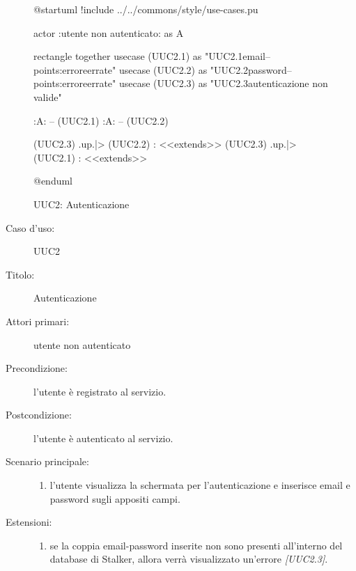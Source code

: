 \documentclass[../../../analisi-dei-requisiti.tex]{subfiles}
\begin{document}
\begin{figure}[h!]
  \centering
  \begin{plantuml}
  @startuml
  !include ../../commons/style/use-cases.pu

  actor :utente non autenticato: as A

  rectangle {
    together {
      usecase (UUC2.1) as "UUC2.1\nInserimento email\n--\nExtension points:\nVisualizzazione errore\ncredenziali errate"
      usecase (UUC2.2) as "UUC2.2\nInserimento password\n--\nExtension points:\nVisualizzazione errore\ncredenziali errate"
      usecase (UUC2.3) as "UUC2.3\nInformazioni autenticazione non valide"
    }
  }

  :A: -- (UUC2.1)
  :A: -- (UUC2.2)

  (UUC2.3) .up.|> (UUC2.2) : <<extends>>
  (UUC2.3) .up.|> (UUC2.1) : <<extends>>

  @enduml
  \end{plantuml}
  \caption{UUC2: Autenticazione}
  \label{fig:uuc2}
\end{figure}

\begin{description}
  \item[Caso d’uso:] UUC2
  \item[Titolo:] Autenticazione
  \item[Attori primari:] utente non autenticato
  \item[Precondizione:] l'utente è registrato al servizio.
  \item[Postcondizione:] l'utente è autenticato al servizio.
  \item[Scenario principale:]
  \begin{enumerate}
    \item l'utente visualizza la schermata per l'autenticazione e inserisce email e password sugli appositi campi.
  \end{enumerate}
  \item[Estensioni:]
  \begin{enumerate}
    \item se la coppia email-password inserite non sono presenti all'interno del database di Stalker, allora verrà visualizzato un'errore \emph{[UUC2.3]}.
  \end{enumerate}
\end{description}
\end{document}
